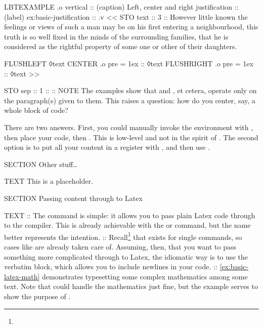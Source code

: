 \begin{lbt}
    LBTEXAMPLE .o vertical
    :: (caption) Left, center and right justification
    :: (label) ex:basic-justification
    :: .v <<
      STO text :: 3 :: However little known the feelings or views of such a man may be on his first entering a neighbourhood, this truth is so well fixed in the minds of the surrounding families, that he is considered as the rightful property of some one or other of their daughters.

      FLUSHLEFT ◊text
      CENTER .o pre = 1ex :: ◊text
      FLUSHRIGHT .o pre = 1ex :: ◊text
    >>

    STO sep :: 1 :: {:}{:}
    NOTE The examples show that  and , et cetera, operate only on the paragraph(s) given to them. This raises a question: how do you center, say, a whole block of \lbtlogo{} code? \par There are two answers. First, you could manually invoke the  environment with , then place your code, then . This is low-level and not in the spirit of \lbtlogo. The second option is to put all your content in a register with , and then use . \par {}


    SECTION Other stuff\dots

    TEXT This is a placeholder.

    SECTION Passing content through to Latex

    TEXT
    :: The  command is simple: it allows you to pass plain Latex code through to the compiler. This is already achievable with the  or  command, but the name  better represents the intention.
    :: Recall\footnote{} that  exists for single commands, so cases like  are already taken care of. Assuming, then, that you want to pass something more complicated through to Latex, the idiomatic way is to use the  verbatim block, which allows you to include newlines in your code.
    :: \cref{ex:basic-latex-math} demonstrates typesetting some complex mathematics among some text. Note that  could handle the mathematics just fine, but the example serves to show the purpose of .


\end{lbt}
